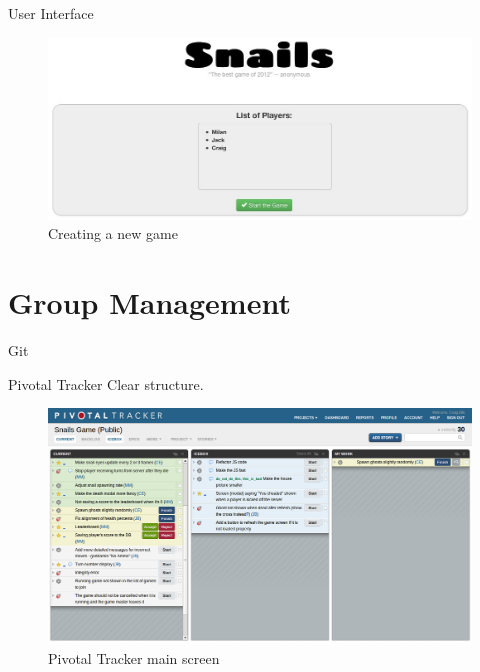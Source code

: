 \documentclass{beamer}
\begin{document}
\begin{frame}{User Interface}
  \begin{figure}[hb]
    \centering
    \includegraphics[scale=0.3]{create.jpg}
    \caption{Creating a new game}
  \end{figure}
\end{frame}


\section{Group Management}

\begin{frame}{Git}
\end{frame}

\begin{frame}{Pivotal Tracker}
  Clear structure.\\
  \begin{figure}[hb]
    \centering
    \includegraphics[scale=0.2]{pivotal.png}
    \caption{Pivotal Tracker main screen}
  \end{figure}
\end{frame}
\end{document}
